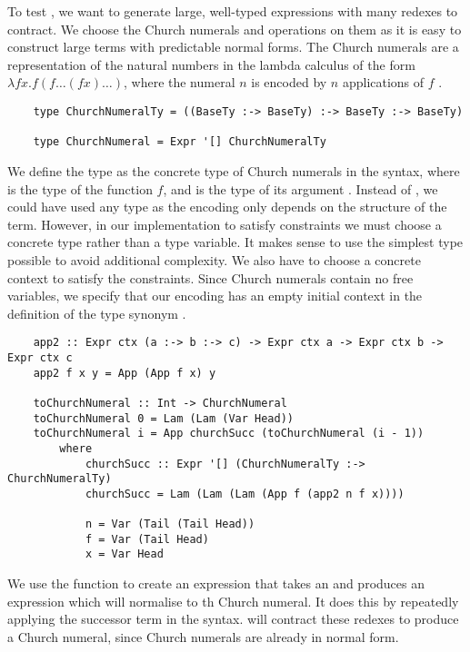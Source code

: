 To test , we want to generate large, well-typed expressions with many redexes to contract. We choose the Church numerals and operations on them as it is easy to construct large terms with predictable normal forms. The Church numerals are a representation of the natural numbers in the lambda calculus of the form $\lambda f x . f (f \dots (f x) \dots)$, where the numeral $n$ is encoded by $n$ applications of $f$ \cite{churchEncodings}.  

\begin{lstlisting}
    type ChurchNumeralTy = ((BaseTy :-> BaseTy) :-> BaseTy :-> BaseTy)

    type ChurchNumeral = Expr '[] ChurchNumeralTy
\end{lstlisting}

We define the type  as the concrete type of Church numerals in the  syntax, where  is the type of the function $f$, and  is the type of its argument . Instead of , we could have used any type as the encoding only depends on the structure of the term. However, in our implementation to satisfy  constraints we must choose a concrete type rather than a type variable. It makes sense to use the simplest type possible to avoid additional complexity. We also have to choose a concrete context to satisfy the  constraints. Since Church numerals contain no free variables, we specify that our encoding has an empty initial context in the definition of the type synonym . 

\begin{lstlisting}
    app2 :: Expr ctx (a :-> b :-> c) -> Expr ctx a -> Expr ctx b -> Expr ctx c
    app2 f x y = App (App f x) y 

    toChurchNumeral :: Int -> ChurchNumeral
    toChurchNumeral 0 = Lam (Lam (Var Head))
    toChurchNumeral i = App churchSucc (toChurchNumeral (i - 1)) 
        where
            churchSucc :: Expr '[] (ChurchNumeralTy :-> ChurchNumeralTy)
            churchSucc = Lam (Lam (Lam (App f (app2 n f x))))

            n = Var (Tail (Tail Head))
            f = Var (Tail Head)
            x = Var Head
\end{lstlisting}

We use the  function to create an expression that takes an   and produces an expression which will normalise to th Church numeral. It does this by repeatedly applying the successor term  in the syntax.  will contract these redexes to produce a Church numeral, since Church numerals are already in normal form. 

